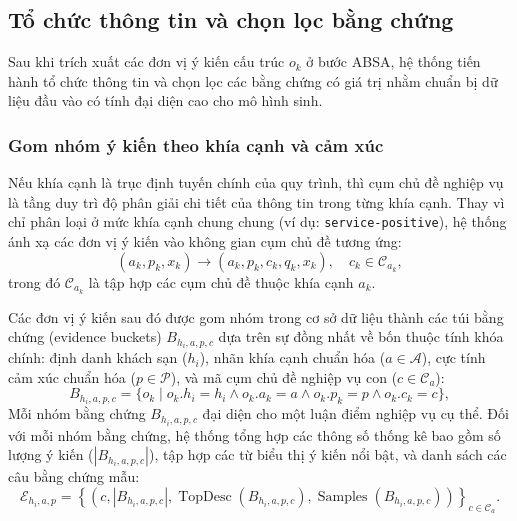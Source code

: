 \subsection{Tổ chức thông tin và chọn lọc bằng chứng}
\label{subsec:method1-information-organization}

Sau khi trích xuất các đơn vị ý kiến cấu trúc $o_k$ ở bước ABSA, hệ thống tiến hành tổ chức thông tin và chọn lọc các bằng chứng có giá trị nhằm chuẩn bị dữ liệu đầu vào có tính đại diện cao cho mô hình sinh.

\subsubsection{Gom nhóm ý kiến theo khía cạnh và cảm xúc}
\label{subsubsec:method1-evidence-grouping}

Nếu khía cạnh là trục định tuyến chính của quy trình, thì cụm chủ đề nghiệp vụ là tầng duy trì độ phân giải chi tiết của thông tin trong từng khía cạnh. Thay vì chỉ phân loại ở mức khía cạnh chung chung (ví dụ: \texttt{service-positive}), hệ thống ánh xạ các đơn vị ý kiến vào không gian cụm chủ đề tương ứng:
\begin{equation}
(a_k, p_k, x_k) \rightarrow (a_k, p_k, c_k, q_k, x_k), \quad c_k \in \mathcal{C}_{a_k},
\label{eq:method1-cum-enrichment}
\end{equation}
trong đó $\mathcal{C}_{a_k}$ là tập hợp các cụm chủ đề thuộc khía cạnh $a_k$.

Các đơn vị ý kiến sau đó được gom nhóm trong cơ sở dữ liệu thành các túi bằng chứng (evidence buckets) $B_{h_i,a,p,c}$ dựa trên sự đồng nhất về bốn thuộc tính khóa chính: định danh khách sạn ($h_i$), nhãn khía cạnh chuẩn hóa ($a \in \mathcal{A}$), cực tính cảm xúc chuẩn hóa ($p \in \mathcal{P}$), và mã cụm chủ đề nghiệp vụ con ($c \in \mathcal{C}_{a}$):
\begin{equation}
B_{h_i,a,p,c} = \{o_k \mid o_k.h_i = h_i \land o_k.a_k = a \land o_k.p_k = p \land o_k.c_k = c\},
\label{eq:method1-evidence-bucket}
\end{equation}
Mỗi nhóm bằng chứng $B_{h_i,a,p,c}$ đại diện cho một luận điểm nghiệp vụ cụ thể. Đối với mỗi nhóm bằng chứng, hệ thống tổng hợp các thông số thống kê bao gồm số lượng ý kiến ($|B_{h_i,a,p,c}|$), tập hợp các từ biểu thị ý kiến nổi bật, và danh sách các câu bằng chứng mẫu:
\begin{equation}
\mathcal{E}_{h_i,a,p} = \left\{ \left(c, |B_{h_i,a,p,c}|, \operatorname{TopDesc}(B_{h_i,a,p,c}), \operatorname{Samples}(B_{h_i,a,p,c})\right) \right\}_{c\in\mathcal{C}_a}.
\label{eq:method1-sentiment-evidence-payload}
\end{equation}


